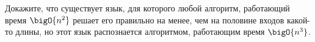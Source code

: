 Докажите, что существует язык, для которого любой алгоритм, работающий время $\bigO{n^2}$ решает его
правильно на менее, чем на половине входов какой-то длины, но этот язык распознается алгоритмом,
работающим время $\bigO{n^3}$.
